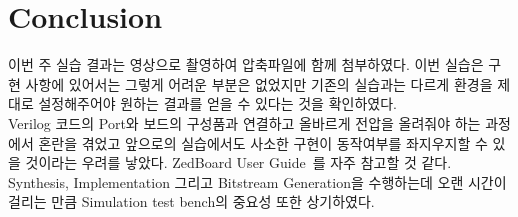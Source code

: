 \documentclass{article}
\begin{document}
\section{Conclusion}
이번 주 실습 결과는 영상으로 촬영하여 압축파일에 함께 첨부하였다.
이번 실습은 구현 사항에 있어서는 그렇게 어려운 부분은 없었지만 기존의 실습과는 다르게 환경을 제대로 설정해주어야 원하는 결과를 얻을 수 있다는 것을 확인하였다. \\

Verilog 코드의 Port와 보드의 구성품과 연결하고 올바르게 전압을 올려줘야 하는 과정에서 혼란을 겪었고 앞으로의 실습에서도 사소한 구현이 동작여부를 좌지우지할 수 있을 것이라는 우려를 낳았다. ZedBoard User Guide~\cite{UG}를 자주 참고할 것 같다. Synthesis, Implementation 그리고 Bitstream Generation을 수행하는데 오랜 시간이 걸리는 만큼 Simulation test bench의 중요성 또한 상기하였다.\\



\end{document}
